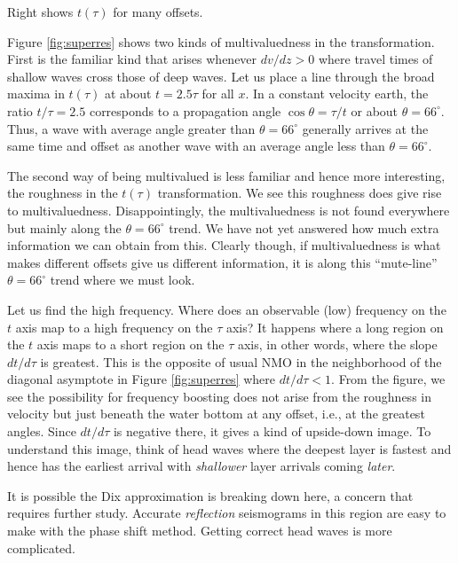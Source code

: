  {
	Right shows $t(\tau)$ for many offsets.
	}

\par
Figure \ref{fig:superres} shows two kinds of multivaluedness
in the transformation.
First is the familiar kind that arises whenever $dv/dz > 0$
where travel times of shallow waves cross those of deep waves.
Let us place a line through the broad maxima in $t(\tau)$
at about $t=2.5\tau$ for all $x$.
In a constant velocity earth, the ratio $t/\tau=2.5$
corresponds to a propagation angle $\cos\theta = \tau/t$ or
about $\theta = 66^\circ$.
Thus, a wave with average angle greater than
$\theta = 66^\circ$
generally arrives at the same time and offset
as another wave with an average angle less than
$\theta = 66^\circ$.

\par
The second
way of being multivalued
is less familiar
and hence more interesting,
the roughness in the $t(\tau)$ transformation.
We see this roughness does give rise to multivaluedness.
Disappointingly, the multivaluedness
is not found everywhere but mainly along the
$\theta = 66^\circ$
trend.
We have not yet answered how much extra information we can obtain from this.
Clearly though, if multivaluedness is what makes different offsets
give us different information,
it is along this ``mute-line''
$\theta = 66^\circ$
trend where we must look.

\par
Let us find the high frequency.
Where does an observable (low) frequency on the $t$ axis
map to a high frequency on the $\tau$ axis?
It happens where a long region on the $t$ axis
maps to a short region on the $\tau$ axis,
in other words, where the slope $dt/d\tau$ is greatest.
This is the opposite of usual NMO
in the neighborhood of the diagonal asymptote
in Figure \ref{fig:superres}
where $dt/d\tau<1$.
From the figure,
we see the possibility for frequency boosting
does not arise from the roughness in velocity
but just beneath the water bottom at any offset,
i.e., at the greatest angles.
Since $dt/d\tau$ is negative there,
it gives a kind of upside-down image.
To understand this image, think of head waves where
the deepest layer is fastest and hence has the earliest arrival
with
{\it shallower}
layer arrivals coming
{\it later}.
\par
It is possible the Dix approximation is breaking down here,
a concern that requires further study.
Accurate
{\it reflection} seismograms in this region
are easy to make with the phase shift method.
Getting correct head waves is more complicated.

